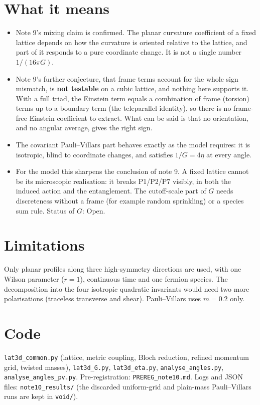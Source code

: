 \documentclass[11pt]{article}
\begin{document}
\section{What it means}
\begin{itemize}
\item Note 9's mixing claim is confirmed. The planar curvature coefficient of a fixed lattice depends on how the curvature is oriented relative to the lattice, and part of it responds to a pure coordinate change. It is not a single number $1/(16\pi G)$.
\item Note 9's further conjecture, that frame terms account for the whole sign mismatch, is \textbf{not testable} on a cubic lattice, and nothing here supports it. With a full triad, the Einstein term equals a combination of frame (torsion) terms up to a boundary term (the teleparallel identity), so there is no frame-free Einstein coefficient to extract. What can be said is that no orientation, and no angular average, gives the right sign.
\item The covariant Pauli--Villars part behaves exactly as the model requires: it is isotropic, blind to coordinate changes, and satisfies $1/G=4\eta$ at every angle.
\item For the model this sharpens the conclusion of note 9. A fixed lattice cannot be its microscopic realisation: it breaks P1/P2/P7 visibly, in both the induced action and the entanglement. The cutoff-scale part of $G$ needs discreteness without a frame (for example random sprinkling) or a species sum rule. Status of $G$: Open.
\end{itemize}

\section{Limitations}
Only planar profiles along three high-symmetry directions are used, with one Wilson parameter ($r=1$), continuous time and one fermion species. The decomposition into the four isotropic quadratic invariants would need two more polarisations (traceless transverse and shear). Pauli--Villars uses $m=0.2$ only.

\section*{Code}
\texttt{lat3d\_common.py} (lattice, metric coupling, Bloch reduction, refined momentum grid, twisted masses), \texttt{lat3d\_G.py}, \texttt{lat3d\_eta.py}, \texttt{analyse\_angles.py}, \texttt{analyse\_angles\_pv.py}. Pre-registration: \texttt{PREREG\_note10.md}. Logs and JSON files: \texttt{note10\_results/} (the discarded uniform-grid and plain-mass Pauli--Villars runs are kept in \texttt{void/}).
\end{document}
